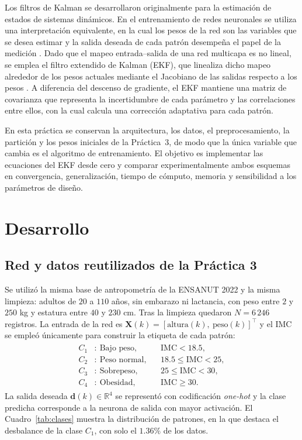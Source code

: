 \documentclass[conference]{IEEEtran}
\begin{document}
Los filtros de Kalman se desarrollaron originalmente para la estimación de
estados de sistemas dinámicos. En el entrenamiento de redes neuronales se
utiliza una interpretación equivalente, en la cual los pesos de la red son
las variables que se desea estimar y la salida deseada de cada patrón
desempeña el papel de la medición \cite{b1,b2,b3,b4}. Dado que el mapeo
entrada--salida de una red multicapa es no lineal, se emplea el filtro
extendido de Kalman (EKF), que linealiza dicho mapeo alrededor de los pesos
actuales mediante el Jacobiano de las salidas respecto a los pesos
\cite{b5,b7}. A diferencia del descenso de gradiente, el EKF mantiene una
matriz de covarianza que representa la incertidumbre de cada parámetro y
las correlaciones entre ellos, con la cual calcula una corrección adaptativa
para cada patrón.

En esta práctica se conservan la arquitectura, los datos, el
preprocesamiento, la partición y los pesos iniciales de la Práctica~3, de
modo que la única variable que cambia es el algoritmo de entrenamiento. El
objetivo es implementar las ecuaciones del EKF desde cero y comparar
experimentalmente ambos esquemas en convergencia, generalización, tiempo de
cómputo, memoria y sensibilidad a los parámetros de diseño.

\section{Desarrollo}

\subsection{Red y datos reutilizados de la Práctica 3}
Se utilizó la misma base de antropometría de la ENSANUT 2022 \cite{b6} y la
misma limpieza: adultos de $20$ a $110$ años, sin embarazo ni lactancia,
con peso entre $2$ y $250$ kg y estatura entre $40$ y $230$ cm. Tras la
limpieza quedaron $N=6\,246$ registros. La entrada de la red es
$\mathbf{X}(k)=[\text{altura}(k),\ \text{peso}(k)]^\top$ y el IMC se empleó
únicamente para construir la etiqueta de cada patrón:
\begin{align}
    \label{eq:clases}
    \begin{aligned}
    C_1&:\ \text{Bajo peso}, &&\text{IMC}<18.5,\\
    C_2&:\ \text{Peso normal}, &&18.5\leq\text{IMC}<25,\\
    C_3&:\ \text{Sobrepeso}, &&25\leq\text{IMC}<30,\\
    C_4&:\ \text{Obesidad}, &&\text{IMC}\geq30.
    \end{aligned}
\end{align}
La salida deseada $\mathbf{d}(k)\in\mathbb{R}^4$ se representó con
codificación \textit{one-hot} y la clase predicha corresponde a la neurona
de salida con mayor activación. El Cuadro~\ref{tab:clases} muestra la
distribución de patrones, en la que destaca el desbalance de la clase
$C_1$, con solo el $1.36\%$ de los datos.
\end{document}
